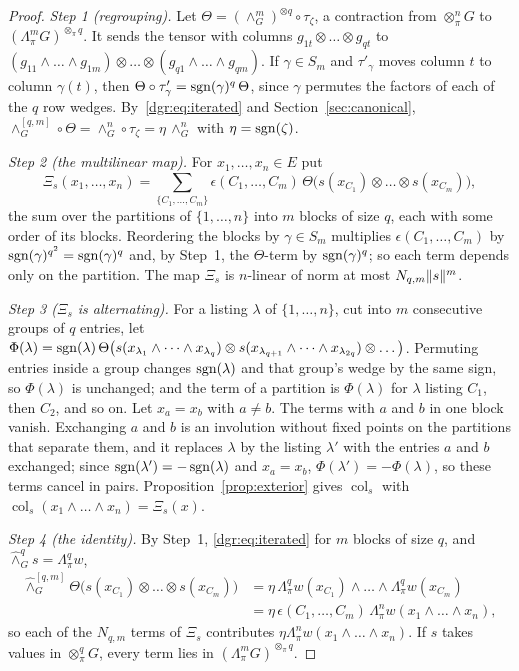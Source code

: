 \begin{proof}
\emph{Step 1 (regrouping).} Let $\Theta=(\wedge^m_G)^{\otimes q}\circ\tau_\zeta$, a contraction from $\otimes^n_\pi G$
to $(\Lambda^m_\pi G)^{\otimes_\pi q}$. It sends the tensor with columns $g_{1t}\otimes\dots\otimes g_{qt}$ to
$(g_{11}\wedge\dots\wedge g_{1m})\otimes\dots\otimes(g_{q1}\wedge\dots\wedge g_{qm})$. If $\gamma\in S_m$ and
$\tau'_\gamma$ moves column $t$ to column $\gamma(t)$, then $\Theta\circ\tau'_\gamma=\operatorname{sgn}(\gamma)^q\,\Theta$, since $\gamma$
permutes the factors of each of the $q$ row wedges. By~\eqref{dgr:eq:iterated} and Section~\ref{sec:canonical},
$\wedge^{[q,m]}_G\circ\Theta=\wedge^n_G\circ\tau_\zeta=\eta\,\wedge^n_G$ with $\eta=\operatorname{sgn}(\zeta)$.

\emph{Step 2 (the multilinear map).} For $x_1,\dots,x_n\in E$ put
\[
 \Xi_s(x_1,\dots,x_n)=\sum_{\{C_1,\dots,C_m\}}\epsilon(C_1,\dots,C_m)\,
 \Theta\bigl(s(x_{C_1})\otimes\dots\otimes s(x_{C_m})\bigr),
\]
the sum over the partitions of $\{1,\dots,n\}$ into $m$ blocks of size $q$, each with some order of its blocks.
Reordering the blocks by $\gamma\in S_m$ multiplies $\epsilon(C_1,\dots,C_m)$ by $\operatorname{sgn}(\gamma)^{q^2}=\operatorname{sgn}(\gamma)^q$ and,
by Step~1, the $\Theta$-term by $\operatorname{sgn}(\gamma)^q$; so each term depends only on the partition. The map $\Xi_s$ is
$n$-linear of norm at most $N_{q,m}\lVert s\rVert^m$.

\emph{Step 3 ($\Xi_s$ is alternating).} For a listing $\lambda$ of $\{1,\dots,n\}$, cut into $m$ consecutive groups of $q$
entries, let $\Phi(\lambda)=\operatorname{sgn}(\lambda)\,\Theta\bigl(s(x_{\lambda_1}\wedge\dots\wedge x_{\lambda_q})\otimes
s(x_{\lambda_{q+1}}\wedge\dots\wedge x_{\lambda_{2q}})\otimes\dots\bigr)$. Permuting entries inside a group changes
$\operatorname{sgn}(\lambda)$ and that group's wedge by the same sign, so $\Phi(\lambda)$ is unchanged; and the term of a partition is
$\Phi(\lambda)$ for $\lambda$ listing $C_1$, then $C_2$, and so on. Let $x_a=x_b$ with $a\ne b$. The terms with $a$ and
$b$ in one block vanish. Exchanging $a$ and $b$ is an involution without fixed points on the partitions that separate
them, and it replaces $\lambda$ by the listing $\lambda'$ with the entries $a$ and $b$ exchanged; since
$\operatorname{sgn}(\lambda')=-\operatorname{sgn}(\lambda)$ and $x_a=x_b$, $\Phi(\lambda')=-\Phi(\lambda)$, so these terms cancel in pairs.
Proposition~\ref{prop:exterior} gives $\operatorname{col}_s$ with $\operatorname{col}_s(x_1\wedge\dots\wedge x_n)=\Xi_s(x)$.

\emph{Step 4 (the identity).} By Step~1, \eqref{dgr:eq:iterated} for $m$ blocks of size $q$, and
$\widehat\wedge^q_Gs=\Lambda^q_\pi w$,
\[
\begin{aligned}
 \widehat\wedge^{[q,m]}_G\Theta\bigl(s(x_{C_1})\otimes\dots\otimes s(x_{C_m})\bigr)
 &=\eta\,\Lambda^q_\pi w(x_{C_1})\wedge\dots\wedge\Lambda^q_\pi w(x_{C_m})\\
 &=\eta\,\epsilon(C_1,\dots,C_m)\,\Lambda^n_\pi w(x_1\wedge\dots\wedge x_n),
\end{aligned}
\]
so each of the $N_{q,m}$ terms of $\Xi_s$ contributes $\eta\Lambda^n_\pi w(x_1\wedge\dots\wedge x_n)$. If $s$ takes values
in $\otimes^q_\pi G$, every term lies in $(\Lambda^m_\pi G)^{\otimes_\pi q}$.
\end{proof}

